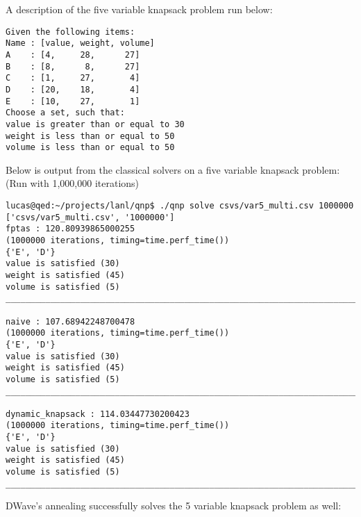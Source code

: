\documentclass{article}
\begin{document}
A description of the five variable knapsack problem run below:
\begin{verbatim}
Given the following items:
Name : [value, weight, volume]
A    : [4,     28,      27]
B    : [8,      8,      27]
C    : [1,     27,       4]
D    : [20,    18,       4]
E    : [10,    27,       1]
Choose a set, such that:
value is greater than or equal to 30
weight is less than or equal to 50
volume is less than or equal to 50
\end{verbatim}

Below is output from the classical solvers on a five variable knapsack problem:
(Run with 1,000,000 iterations)

\begin{verbatim}
lucas@qed:~/projects/lanl/qnp$ ./qnp solve csvs/var5_multi.csv 1000000
['csvs/var5_multi.csv', '1000000']
fptas : 120.80939865000255
(1000000 iterations, timing=time.perf_time())
{'E', 'D'}
value is satisfied (30)
weight is satisfied (45)
volume is satisfied (5)
________________________________________________________________________________

naive : 107.68942248700478
(1000000 iterations, timing=time.perf_time())
{'E', 'D'}
value is satisfied (30)
weight is satisfied (45)
volume is satisfied (5)
________________________________________________________________________________

dynamic_knapsack : 114.03447730200423
(1000000 iterations, timing=time.perf_time())
{'E', 'D'}
value is satisfied (30)
weight is satisfied (45)
volume is satisfied (5)
________________________________________________________________________________
\end{verbatim}

DWave's annealing successfully solves the 5 variable knapsack problem as well:
\end{document}
